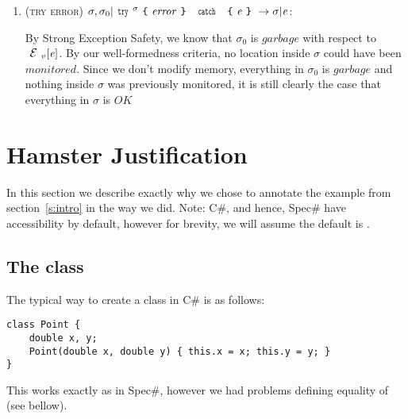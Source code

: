 \begin{enumerate}
\begin{itemize}
\end{itemize}

\item (\textsc{try error}) $\sigma,\sigma_0|\Kw{try}^\sigma\oC \mathit{error}\cC\ \Kw{catch}\ \oC\e\cC\rightarrow \sigma|\e$:

	By Strong Exception Safety, we know that $\sigma_0$ is $\mathit{garbage}$ with respect to $\ctx_v[\e]$. By our well-formedness criteria, no location inside $\sigma$ could have been $monitored$.
	Since we don't modify memory, everything in $\sigma_0$ is $\mathit{garbage}$ and nothing inside $\sigma$ was previously monitored, it is still clearly the case that everything in $\sigma$ is $\mathit{OK}$ 
\end{enumerate}





\section{Hamster Justification}
\label{s:proof}
\lstset{
language={[Sharp]C}, morekeywords={invariant,ensures,requires,expose,exists}]
[Pure][Reads(ReadsAttribute.Reads.Nothing)}

In this section we describe exactly why we chose to annotate the example from section~\ref{s:intro} in the way we did. Note: C\#, and hence, Spec\# have \Q@private@ accessibility by default, however for brevity, we will assume the default is \Q@public@.

\subsection{The \Q@Point@ class} 
The typical way to create a \Q@Point@ class in C\# is as follows:
\begin{lstlisting}
class Point {
	double x, y;
	Point(double x, double y) { this.x = x; this.y = y; }
}
\end{lstlisting}
This works exactly as in Spec\#, however we had problems defining equality of \Q@Point@s (see bellow).

